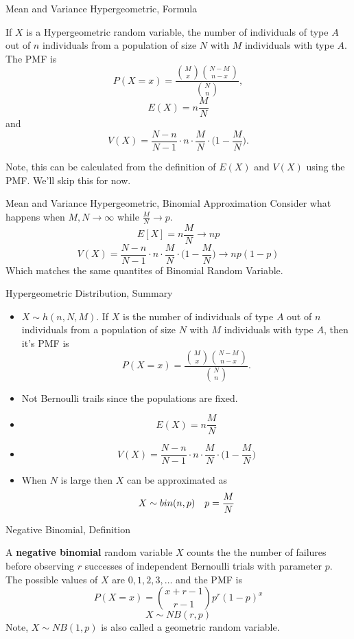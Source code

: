 \documentclass[handout]{beamer}
\begin{document}
\begin{frame}{Mean and Variance Hypergeometric, Formula}
    \begin{block}{}
        If $X$ is a Hypergeometric random variable, the number of individuals of type $A$ out of $n$ individuals from a population of size $N$ with $M$ individuals with type $A$. The PMF is
        $$P(X=x)=\frac{\binom{M}x\binom{N-M}{n-x}}{\binom N n},$$
        $$ E(X) = n\frac{M}{N} $$
        and 
        $$ V(X) = \frac{N-n}{N-1} \cdot n \cdot \frac{M}{N} \cdot \bigg( 1 - \frac{M}{N} \bigg) .$$
        \end{block}
        Note, this can be calculated from the definition of $E(X)$ and $V(X)$ using the PMF. We'll skip this for now.
\end{frame}
\begin{frame}{Mean and Variance Hypergeometric, Binomial Approximation}
        Consider what happens when $M,N\to \infty$ while $\frac{M}{N} \to p$.
        \\
        $$ E[X] = n\frac{M}{N} \to np $$
        $$ V(X) = \frac{N-n}{N-1} \cdot n \cdot \frac{M}{N} \cdot \bigg( 1 - \frac{M}{N} \bigg) \to n p (1-p) $$
        Which matches the same quantites of Binomial Random Variable.
\end{frame}
\begin{frame}{Hypergeometric Distribution, Summary}
    \begin{itemize}
        \item $X\sim h(n,N,M)$. If $X$ is the number of individuals of type $A$ out of $n$ individuals from a population of size $N$ with $M$ individuals with type $A$, then it's PMF is
        $$P(X=x) = \frac{\binom{M}x\binom{N-M}{n-x}}{\binom N n}.$$
        \item Not Bernoulli trails since the populations are fixed.
        \item $$E(X) = n \frac{M}{N}$$
        \item $$V(X) = \frac{N-n}{N-1} \cdot n \cdot \frac{M}{N} \cdot \bigg( 1 - \frac{M}{N} \bigg)$$
        \item When $N$ is large then $X$ can be approximated as
        $$X \sim bin(n,p) \hskip 1em p =\frac{M}{N}$$
    \end{itemize}
\end{frame}
    \begin{frame}{Negative Binomial, Definition}
        \begin{block}{}
            A \textbf{negative binomial} random variable $X$ counts the the number of failures before observing $r$ successes of independent Bernoulli trials with parameter $p$. The possible values of $X$ are $0,1,2,3,\ldots$ and the PMF is
            $$ P(X=x) = \binom{x+r-1}{r-1}p^r(1-p)^x $$
            $$X \sim NB(r,p)$$
            Note, $X\sim NB(1,p)$ is also called a geometric random variable.
        \end{block}
        \end{frame}
\end{document}
